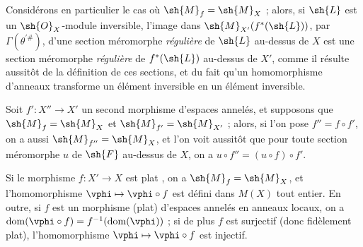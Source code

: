 \begin{env}[20.1.11]
Considérons en particulier le cas où $\sh{M}_f=\sh{M}_X$ ; alors, si $\sh{L}$ est un $\sh{O}_X$-module inversible, l'image dans $\sh{M}_{X'}(f^*(\sh{L}))$, par $\Gamma(\theta^{\prime\#})$, d'une section méromorphe \emph{régulière} de $\sh{L}$ au-dessus de $X$  est une section méromorphe \emph{régulière} de $f^*(\sh{L})$ au-dessus de $X'$, comme il résulte aussitôt de la définition de ces sections, et du fait qu'un homomorphisme d'anneaux transforme un élément inversible en un élément inversible.

Soit $f':X''\to X'$ un second morphisme d'espaces annelés, et supposons que $\sh{M}_f=\sh{M}_X$ et $\sh{M}_{f'}=\sh{M}_{X'}$ ; alors, si l'on pose $f''=f\circ f'$, on a aussi $\sh{M}_{f''}=\sh{M}_X$, et l'on voit aussitôt que pour toute section méromorphe $u$ de $\sh{F}$ au-dessus de $X$, on a $u\circ f''=(u\circ f)\circ f'$.
\end{env}

\begin{proposition}[20.1.12]
\label{IV.20.1.12}
Si le morphisme $f:X'\to X$ est plat , on a $\sh{M}_f=\sh{M}_X$, et l'homomorphisme $\vphi\mapsto\vphi\circ f$ est défini dans $M(X)$ tout entier.
En outre, si $f$ est un morphisme (plat) d'espaces annelés en anneaux locaux, on a $\operatorname{dom}(\vphi\circ f)=f^{-1}(\operatorname{dom}(\vphi))$ ; si de plus $f$ est surjectif (donc fidèlement plat), l'homomorphisme $\vphi\mapsto\vphi\circ f$ est injectif.
\end{proposition}

